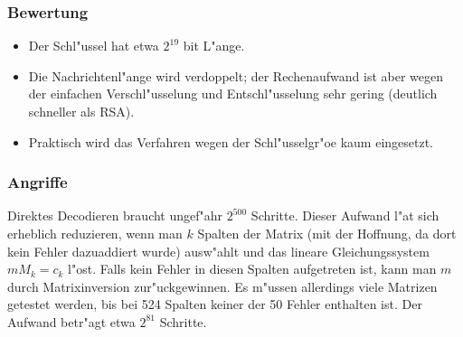       \subsubsection*{Bewertung}
      \begin{itemize}
        \item Der Schl"ussel hat etwa $2^{19}$ bit L"ange.
        \item Die Nachrichtenl"ange wird verdoppelt; der Rechenaufwand ist aber wegen der 
              einfachen Verschl"usselung 
              und Entschl"usselung sehr gering (deutlich schneller als RSA).
        \item Praktisch wird das Verfahren wegen der Schl"usselgr"o\3e kaum eingesetzt.
      \end{itemize}
      \subsubsection*{Angriffe}
      Direktes Decodieren braucht ungef"ahr $2^{500}$ Schritte. Dieser Aufwand l"a\3t 
      sich erheblich reduzieren, wenn man $k$ Spalten der Matrix (mit der Hoffnung, da\3 
      dort kein Fehler dazuaddiert wurde) ausw"ahlt und das lineare Gleichungssystem $mM_k=c_k$ 
      l"ost. Falls kein Fehler in diesen Spalten aufgetreten ist, kann man $m$ 
      durch Matrixinversion zur"uckgewinnen. Es m"ussen allerdings viele Matrizen getestet 
      werden, bis bei 524 Spalten keiner der 50 Fehler enthalten ist. Der Aufwand 
      betr"agt etwa $2^{81}$ Schritte.

 